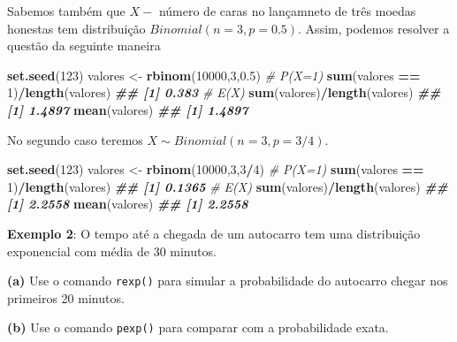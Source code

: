 \documentclass[
]{book}
\newenvironment{Shaded}{\begin{snugshade}}{\end{snugshade}}
\newcommand{\CommentTok}[1]{\textcolor[rgb]{0.56,0.35,0.01}{\textit{#1}}}
\newcommand{\DecValTok}[1]{\textcolor[rgb]{0.00,0.00,0.81}{#1}}
\newcommand{\DocumentationTok}[1]{\textcolor[rgb]{0.56,0.35,0.01}{\textbf{\textit{#1}}}}
\newcommand{\FloatTok}[1]{\textcolor[rgb]{0.00,0.00,0.81}{#1}}
\newcommand{\FunctionTok}[1]{\textcolor[rgb]{0.13,0.29,0.53}{\textbf{#1}}}
\newcommand{\NormalTok}[1]{#1}
\newcommand{\OtherTok}[1]{\textcolor[rgb]{0.56,0.35,0.01}{#1}}
\newcommand{\SpecialCharTok}[1]{\textcolor[rgb]{0.81,0.36,0.00}{\textbf{#1}}}
\begin{document}
Sabemos também que \(X-\) número de caras no lançamneto de três moedas
honestas tem distribuição \(Binomial(n=3,p=0.5)\). Assim, podemos resolver
a questão da seguinte maneira

\begin{Shaded}
\begin{Highlighting}[]
\FunctionTok{set.seed}\NormalTok{(}\DecValTok{123}\NormalTok{)}
\NormalTok{valores }\OtherTok{\textless{}{-}} \FunctionTok{rbinom}\NormalTok{(}\DecValTok{10000}\NormalTok{,}\DecValTok{3}\NormalTok{,}\FloatTok{0.5}\NormalTok{)}
\CommentTok{\# P(X=1)}
\FunctionTok{sum}\NormalTok{(valores }\SpecialCharTok{==} \DecValTok{1}\NormalTok{)}\SpecialCharTok{/}\FunctionTok{length}\NormalTok{(valores)}
\DocumentationTok{\#\# [1] 0.383}
\CommentTok{\# E(X)}
\FunctionTok{sum}\NormalTok{(valores)}\SpecialCharTok{/}\FunctionTok{length}\NormalTok{(valores)}
\DocumentationTok{\#\# [1] 1.4897}
\FunctionTok{mean}\NormalTok{(valores)}
\DocumentationTok{\#\# [1] 1.4897}
\end{Highlighting}
\end{Shaded}

No segundo caso teremos \(X \sim Binomial(n=3,p=3/4)\).

\begin{Shaded}
\begin{Highlighting}[]
\FunctionTok{set.seed}\NormalTok{(}\DecValTok{123}\NormalTok{)}
\NormalTok{valores }\OtherTok{\textless{}{-}} \FunctionTok{rbinom}\NormalTok{(}\DecValTok{10000}\NormalTok{,}\DecValTok{3}\NormalTok{,}\DecValTok{3}\SpecialCharTok{/}\DecValTok{4}\NormalTok{)}
\CommentTok{\# P(X=1)}
\FunctionTok{sum}\NormalTok{(valores }\SpecialCharTok{==} \DecValTok{1}\NormalTok{)}\SpecialCharTok{/}\FunctionTok{length}\NormalTok{(valores)}
\DocumentationTok{\#\# [1] 0.1365}
\CommentTok{\# E(X)}
\FunctionTok{sum}\NormalTok{(valores)}\SpecialCharTok{/}\FunctionTok{length}\NormalTok{(valores)}
\DocumentationTok{\#\# [1] 2.2558}
\FunctionTok{mean}\NormalTok{(valores)}
\DocumentationTok{\#\# [1] 2.2558}
\end{Highlighting}
\end{Shaded}

\textbf{Exemplo 2}: O tempo até a chegada de um autocarro tem uma
distribuição exponencial com média de 30 minutos.

\textbf{(a)} Use o comando \texttt{rexp()} para simular a probabilidade do autocarro
chegar nos primeiros 20 minutos.

\textbf{(b)} Use o comando \texttt{pexp()} para comparar com a probabilidade exata.
\end{document}
